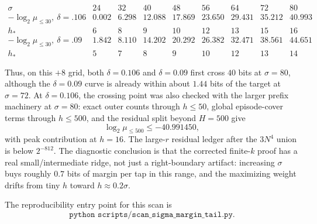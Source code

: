 \[
\begin{array}{c|rrrrrrrr}
\sigma & 24 & 32 & 40 & 48 & 56 & 64 & 72 & 80\\
\hline
-\log_2\mu_{\le30},\ \delta=.106
&0.002&6.298&12.088&17.869&23.650&29.431&35.212&40.993\\
h_*
&6&8&9&10&12&13&15&16\\
\hline
-\log_2\mu_{\le30},\ \delta=.09
&1.842&8.110&14.202&20.292&26.382&32.471&38.561&44.651\\
h_*
&5&7&8&9&10&12&13&14
\end{array}
\]

Thus, on this \(+8\) grid, both \(\delta=0.106\) and \(\delta=0.09\) first cross \(40\) bits at \(\sigma=80\), although
the \(\delta=0.09\) curve is already within about \(1.44\) bits of the target at \(\sigma=72\).  At \(\delta=0.106\),
the crossing point was also checked with the larger prefix machinery at \(\sigma=80\): exact outer counts through
\(h\le50\), global episode-cover terms through \(h\le500\), and the residual split beyond \(H=500\) give
\[
\log_2\mu_{\le500}\le -40.991450,
\]
with peak contribution at \(h=16\).  The large-\(r\) residual ledger after the \(3N^4\) union is below \(2^{-812}\).
The diagnostic conclusion is that the corrected finite-\(k\) proof has a real small/intermediate ridge, not just a
right-boundary artifact: increasing \(\sigma\) buys roughly \(0.7\) bits of margin per tap in this range, and the
maximizing weight drifts from tiny \(h\) toward \(h\approx 0.2\sigma\).

The reproducibility entry point for this scan is
\[
\texttt{python scripts/scan\_sigma\_margin\_tail.py}.
\]
